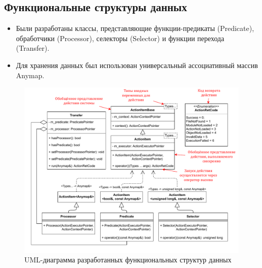﻿%
\subsection{Функциональные структуры данных}
\begin{frame}
    \smaller[1]
    \begin{itemize}
        \item Были разработаны классы, представляющие функции-предикаты (Predicate), обработчики (Processor), селекторы (Selector) и функции перехода (Transfer).
        \item Для хранения данных был использован универсальный ассоциативный массив Anymap.
    \end{itemize}

    \begin{figure}
        \smaller[1]
        \centering
        \includegraphics[height=0.64\textheight]{images/UML.graph_functions.pdf}
        \caption{UML-диаграмма разработанных функциональных структур данных}
    \end{figure}

\end{frame}
